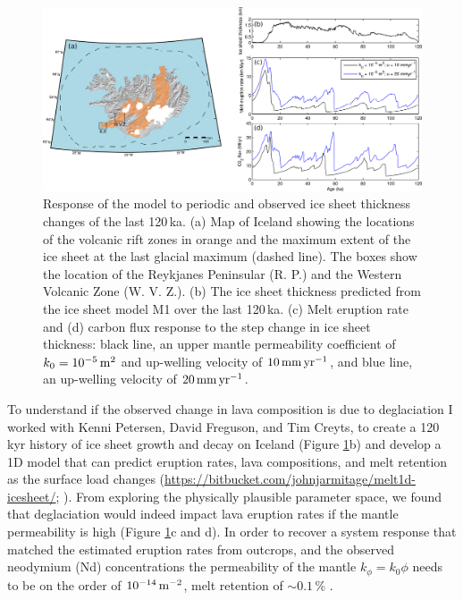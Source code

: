 \begin{figure}
\centering
\includegraphics[width=\textwidth]{./figures/ch2-iceland-map.png}
\caption{Response of the model to periodic and observed ice sheet thickness changes of the last 120\,ka. (a) Map of Iceland showing the locations of the volcanic rift zones in orange and the maximum extent of the ice sheet at the last glacial maximum (dashed line). The boxes show the location of the Reykjanes Peninsular (R. P.) and the Western Volcanic Zone (W. V. Z.). (b) The ice sheet thickness predicted from the ice sheet model M1 over the last 120\,ka. (c) Melt eruption rate and (d) carbon flux response to the step change in ice sheet thickness: black line, an upper mantle permeability coefficient of $k_{0} = 10^{-5}\rm\,m^{2}$ and up-welling velocity of $10\rm\,mm\,yr^{-1}$, and blue line, an up-welling velocity of $20\rm\,mm\,yr^{-1}$.}
\label{fg:iceland-map}
\end{figure}

To understand if the observed change in lava composition is due to deglaciation I worked with Kenni Petersen, David Freguson, and Tim Creyts, to create a 120\,kyr history of ice sheet growth and decay on Iceland (Figure \ref{fg:iceland-map}b) and develop a 1D model that can predict eruption rates, lava compositions, and melt retention as the surface load changes (\url{https://bitbucket.com/johnjarmitage/melt1d-icesheet/}; \citealp{armitage-etal-grl-2019}). From exploring the physically plausible parameter space, we found that deglaciation would indeed impact lava eruption rates if the mantle permeability is high (Figure \ref{fg:iceland-map}c and d). In order to recover a system response that matched the estimated eruption rates from outcrops, and the observed neodymium (Nd) concentrations the permeability of the mantle $k_{\phi} = k_{0}\phi$ needs to be on the order of $10^{-14}\rm\,m^{-2}$, melt retention of $\sim 0.1$\,\% \citep{armitage-etal-grl-2019}.


